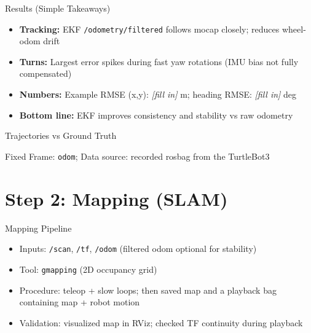 \documentclass[10pt]{beamer}
\begin{document}
\begin{frame}{Results (Simple Takeaways)}
\begin{itemize}
    \item \textbf{Tracking:} EKF \texttt{/odometry/filtered} follows mocap closely; reduces wheel-odom drift
    \item \textbf{Turns:} Largest error spikes during fast yaw rotations (IMU bias not fully compensated)
    \item \textbf{Numbers:} Example RMSE (x,y): \textit{[fill in]} m; heading RMSE: \textit{[fill in]} deg
    \item \textbf{Bottom line:} EKF improves consistency and stability vs raw odometry
\end{itemize}
\end{frame}

\begin{frame}{Trajectories vs Ground Truth}
\centering
{}

\vspace{2mm}
{\scriptsize Fixed Frame: \texttt{odom}; Data source: recorded rosbag from the TurtleBot3}
\end{frame}

\section{Step 2: Mapping (SLAM)}

\begin{frame}{Mapping Pipeline}
\begin{itemize}
    \item Inputs: \texttt{/scan}, \texttt{/tf}, \texttt{/odom} (filtered odom optional for stability)
    \item Tool: \texttt{gmapping} (2D occupancy grid)
    \item Procedure: teleop + slow loops; then saved map and a playback bag containing map + robot motion
    \item Validation: visualized map in RViz; checked TF continuity during playback
\end{itemize}
\end{frame}
\end{document}
